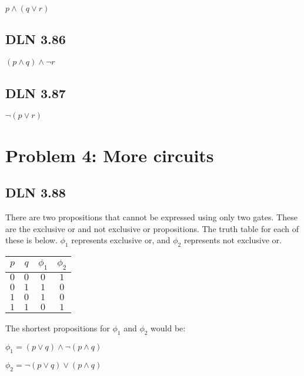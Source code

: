 \documentclass[titlepage]{article}
\begin{document}
\( p \land (q \lor r) \)

\subsection{DLN 3.86} 

\( (p \land q) \land \lnot r \)

\subsection{DLN 3.87} 

\( \lnot (p \lor r) \)

\section{Problem 4: More circuits}

\subsection{DLN 3.88} 

There are two propositions that cannot be expressed using only two gates. These are the exclusive or and not exclusive or propositions. The truth table for each of these is below. $\phi _1$ represents exclusive or, and $\phi _2$ represents not exclusive or.

\begin{center}
\begin{tabular}{c c|c|c}
\textbf{$p$} & \textbf{$q$} & \textbf{$\phi _1$} & \textbf{$\phi _2$} \\ \hline
\(0\) & \(0\) & \(0\) & \(1\) \\
\(0\) & \(1\) & \(1\) & \(0\) \\
\(1\) & \(0\) & \(1\) & \(0\) \\
\(1\) & \(1\) & \(0\) & \(1\) \\
\end{tabular}
\end{center}

The shortest propositions for $\phi _1$ and $\phi _2$ would be:

\( \phi _1 = (p \lor q) \land \lnot(p \land q)\)

\( \phi _2 = \lnot (p \lor q) \lor (p \land q)\)
\end{document}

